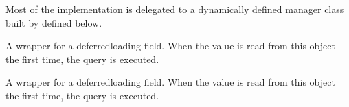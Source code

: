 \documentclass[letterpaper,10pt,spanish]{sphinxmanual}
\begin{document}
\begin{fulllineitems}
\begin{fulllineitems}
\sphinxAtStartPar
Most of the implementation is delegated to a dynamically defined manager
class built by  defined below.

\end{fulllineitems}



\begin{fulllineitems}

\pysigstartsignatures
{}
\pysigstopsignatures
\sphinxAtStartPar
A wrapper for a deferred\sphinxhyphen{}loading field. When the value is read from this
object the first time, the query is executed.

\end{fulllineitems}



\begin{fulllineitems}

\pysigstartsignatures
{}
\pysigstopsignatures
\sphinxAtStartPar
A wrapper for a deferred\sphinxhyphen{}loading field. When the value is read from this
object the first time, the query is executed.

\end{fulllineitems}



\begin{fulllineitems}

\pysigstartsignatures
{}
\pysigstopsignatures
\end{fulllineitems}


\end{fulllineitems}
\end{document}

